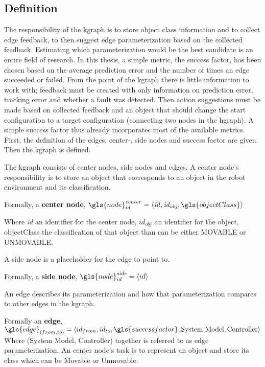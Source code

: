 \subsection{Definition}%
\label{subsec:kgraph_definition}
The responsibility of the \ac{kgraph} is to store object class information and to collect edge feedback, to then suggest edge parameterization based on the collected feedback. Estimating which parameterization would be the best candidate is an entire field of research. In this thesis, a simple metric, the success factor, has been chosen based on the average prediction error and the number of times an edge succeeded or failed. From the point of the \ac{kgraph} there is little information to work with; feedback must be created with only information on prediction error, tracking error and whether a fault was detected. Then action suggestions must be made based on collected feedback and an object that should change the start configuration to a target configuration (connecting two nodes in the \ac{hgraph}). A simple success factor thus already incorporates most of the available metrics. First, the definition of the edges, center-, side nodes and success factor are given. Then the \ac{kgraph} is defined.\bs

The \ac{kgraph} consists of center nodes, side nodes and edges. A center node's responsibility is to store an object that corresponds to an object in the robot environment and its classification.\bs

Formally, a \textbf{center node}, $\gls{node}^{\mathit{center}}_{id} =\left\langle \mathit{id}, \mathit{id_{obj}}, \gls{objectClass} \right\rangle $\bs

Where \textit{id} an identifier for the center node, $\mathit{id_{obj}}$ an identifier for the object, \gls{objectClass} the classification of that object than can be either MOVABLE or UNMOVABLE.\bs

\noindent A side node is a placeholder for the edge to point to.\bs

Formally, a \textbf{side node}, $\gls{node}^{\mathit{side}}_{id} =\left\langle id \right\rangle $\bs

\noindent An edge describes its parameterization and how that parameterization compares to other edges in the \ac{kgraph}.\bs

Formally an \textbf{edge}, $\gls{edge}_{(from, to)} = \left\langle id_{from}, id_{to}, \gls{successfactor}, \textrm{System Model}, \textrm{Controller}\right\rangle$\bs
\noindent Where (System Model, Controller) together is referred to as edge parameterization.\bs
\noindent An center node's task is to represent an object and store its class which can be Movable or Unmovable.\bs


